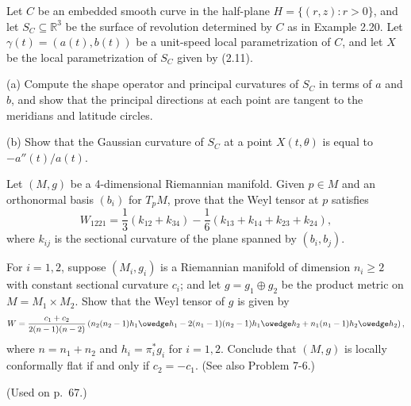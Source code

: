 \begin{exercise}
\label{prob:surface-revolution-shape-principal-curvatures}

Let $C$ be an embedded smooth curve in the half-plane $H = \{(r,z) : r > 0\}$, and let $S_C \subseteq \mathbb{R}^3$ be the surface of revolution determined by $C$ as in Example 2.20. Let $\gamma(t) = (a(t), b(t))$ be a unit-speed local parametrization of $C$, and let $X$ be the local parametrization of $S_C$ given by (2.11).

(a) Compute the shape operator and principal curvatures of $S_C$ in terms of $a$ and $b$, and show that the principal directions at each point are tangent to the meridians and latitude circles.

(b) Show that the Gaussian curvature of $S_C$ at a point $X(t,\theta)$ is equal to $-a''(t)/a(t)$.
\end{exercise}

\begin{exercise}
\label{prob:weyl-tensor-4d}
Let $(M,g)$ be a 4-dimensional Riemannian manifold. Given $p \in M$ and an orthonormal basis $(b_i)$ for $T_p M$, prove that the Weyl tensor at $p$ satisfies
\[
W_{1221} = \frac{1}{3}(k_{12} + k_{34}) - \frac{1}{6}(k_{13} + k_{14} + k_{23} + k_{24}),
\]
where $k_{ij}$ is the sectional curvature of the plane spanned by $(b_i, b_j)$.
\end{exercise}

\begin{exercise}
\label{prob:weyl-tensor-product-metric}
For $i = 1,2$, suppose $(M_i, g_i)$ is a Riemannian manifold of dimension $n_i \ge 2$ with constant sectional curvature $c_i$; and let $g = g_1 \oplus g_2$ be the product metric on $M = M_1 \times M_2$. Show that the Weyl tensor of $g$ is given by
\[
W = \frac{c_1 + c_2}{2(n-1)(n-2)} \left( n_2(n_2-1)h_1 \owedge h_1 - 2(n_1-1)(n_2-1)h_1 \owedge h_2 + n_1(n_1-1)h_2 \owedge h_2 \right),
\]
where $n = n_1 + n_2$ and $h_i = \pi_i^* g_i$ for $i = 1,2$. Conclude that $(M,g)$ is locally conformally flat if and only if $c_2 = -c_1$. (See also Problem 7-6.)

(Used on p.~67.)
\end{exercise}
